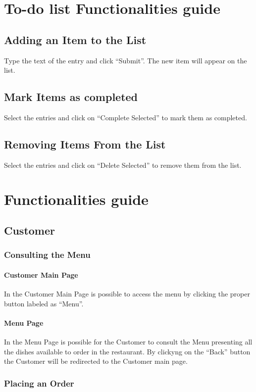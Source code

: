 \section{To-do list Functionalities guide}
\subsection{Adding an Item to the List}
Type the text of the entry and click ``Submit''. The new item will appear on the list.
\subsection{Mark Items as completed}
Select the entries and click on ``Complete Selected'' to mark them as completed. 
\subsection{Removing Items From the List}
Select the entries and click on ``Delete Selected'' to remove them from the list.

\section{\DemoName{} Functionalities guide}
\subsection{Customer}
\subsubsection{Consulting the Menu}
\paragraph{Customer Main Page}
In the Customer Main Page is possible to access the menu by clicking the proper button labeled as ``Menu''.
\paragraph{Menu Page }
In the Menu Page is possible for the Customer to consult the Menu presenting all the dishes available to order in the restaurant.
By clickyng on the ``Back'' button the Customer will be redirected to the Customer main page.

\subsubsection{Placing an Order}
